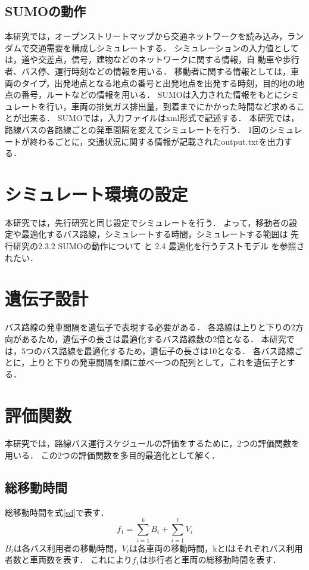 \documentclass[main]{subfiles}
\begin{document}
        \subsection{SUMOの動作}
        本研究では，オープンストリートマップから交通ネットワークを読み込み，ランダムで交通需要を構成しシミュレートする．
        シミュレーションの入力値としては，道や交差点，信号，建物などのネットワークに関する情報，自
        動車や歩行者、バス停、運行時刻などの情報を用いる．
        移動者に関する情報としては，車両のタイプ，出発地点となる地点の番号と出発地点を出発する時刻，目的地の地点の番号，ルートなどの情報を用いる．
        SUMOは入力された情報をもとにシミュレートを行い，車両の排気ガス排出量，到着までにかかった時間など求めることが出来る．
        SUMOでは，入力ファイルはxml形式で記述する．
        本研究では，路線バスの各路線ごとの発車間隔を変えてシミュレートを行う．
        1回のシミュレートが終わるごとに，交通状況に関する情報が記載されたoutput.txtを出力する．
    
    \section{シミュレート環境の設定}
    本研究では，先行研究\cite{senkoukenkyu}と同じ設定でシミュレートを行う．
    よって，移動者の設定や最適化するバス路線，シミュレートする時間，シミュレートする範囲は
    先行研究\cite{senkoukenkyu}の2.3.2 SUMOの動作について と 2.4 最適化を行うテストモデル を参照されたい．
    
    \section{遺伝子設計}
    バス路線の発車間隔を遺伝子で表現する必要がある．
    各路線は上りと下りの2方向があるため，遺伝子の長さは最適化するバス路線数の2倍となる．
    本研究では，5つのバス路線を最適化するため，遺伝子の長さは10となる．
    各バス路線ごとに，上りと下りの発車間隔を順に並べ一つの配列として，これを遺伝子とする．
    
    \section{評価関数}
    本研究では，路線バス運行スケジュールの評価をするために，2つの評価関数を用いる．
    この2つの評価関数を多目的最適化として解く．
    
        \subsection{総移動時間}
        総移動時間を式\ref{sd}で表す．
        \begin{equation}
            f_1 = \sum_{i=1}^{k} B_i + \sum_{i=1}^{l} V_i
            \label{sd}
        \end{equation}
        $B_i$は各バス利用者の移動時間，$V_i$は各車両の移動時間，kとlはそれぞれバス利用者数と車両数を表す．
        これにより$f_1$は歩行者と車両の総移動時間を表す．
\end{document}
